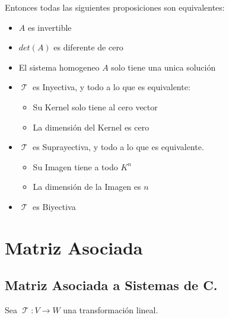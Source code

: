 \documentclass[12pt]{report}                                %
\DeclareMathOperator \LinealTransformation {\mathcal{T}}
\begin{document}
        Entonces todas las siguientes proposiciones son equivalentes:
        \begin{itemize}
            \item $A$ es invertible
            \item $det(A)$ es diferente de cero
            \item El sistema homogeneo $A$ solo tiene una unica solución 
            \item $\LinealTransformation$ es Inyectiva, y todo a lo que es equivalente:
                \begin{itemize}
                    \item Su Kernel solo tiene al cero vector
                    \item La dimensión del Kernel es cero
                \end{itemize}

            \item $\LinealTransformation$ es Suprayectiva, y todo a lo que es equivalente.
                \begin{itemize}
                    \item Su Imagen tiene a todo $K^n$
                    \item La dimensión de la Imagen es $n$
                \end{itemize}
            \item $\LinealTransformation$ es Biyectiva
        \end{itemize}

\chapter{Matriz Asociada}

    \clearpage
    \section{Matriz Asociada a Sistemas de C.}
        Sea $\LinealTransformation : V \to W $ una transformación lineal.
        
\end{document}

